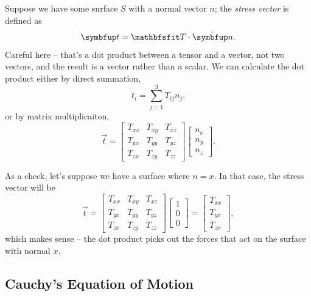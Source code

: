 Suppose we have some surface $S$ with a normal vector $\unit{n}$; the \emph{stress vector} is defined as 
\begin{equation}
\vec{t} = \tens{T} \cdot \unit{n}.
\label{eq_stress}
\end{equation}
Careful here -- that's a dot product between a tensor and a vector, not two vectors, and the result is a vector rather than a scalar.  We can calculate the dot product either by direct summation,
\[
t_i = \sum_{j=1}^3 T_{ij} n_j.
\]
or by matrix multiplicaiton,
\[
\vec{t} = \begin{bmatrix}
T_{xx} & T_{xy} & T_{xz} \\
T_{yx} & T_{yy} & T_{yz} \\
T_{zx} & T_{zy} & T_{zz} 
\end{bmatrix}
\begin{bmatrix}
n_x  \\
n_y  \\
n_z  
\end{bmatrix}.
\]

As a check, let's suppose we have a surface where $\unit{n} = \unit{x}$.  In that case, the stress vector will be
\[
\vec{t} = \begin{bmatrix}
T_{xx} & T_{xy} & T_{xz} \\
T_{yx} & T_{yy} & T_{yz} \\
T_{zx} & T_{zy} & T_{zz} 
\end{bmatrix}
\begin{bmatrix}
1  \\
0  \\
0  
\end{bmatrix} = 
\begin{bmatrix}
T_{xx}  \\
T_{yx}  \\
T_{zx}  
\end{bmatrix},
\]
which makes sense -- the dot product picks out the forces that act on the surface with normal $\unit{x}$.

\subsection{Cauchy's Equation of Motion}

